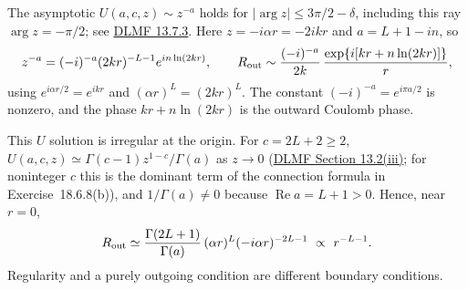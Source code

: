 The asymptotic $U(a,c,z)\sim z^{-a}$ holds for
$|\arg z|\le3\pi/2-\delta$, including this ray $\arg z=-\pi/2$; see
\href{https://dlmf.nist.gov/13.7.E3}{DLMF 13.7.3}.  Here
$z=-i\alpha r=-2ikr$ and $a=L+1-in$, so
\[
z^{-a}=(-i)^{-a}(2kr)^{-L-1}e^{in\ln(2kr)},\qquad
R_{\rm out}\sim\frac{(-i)^{-a}}{2k}\,
 \frac{\exp\{i[kr+n\ln(2kr)]\}}r,
\]
using $e^{i\alpha r/2}=e^{ikr}$ and $(\alpha r)^L=(2kr)^L$.
The constant $(-i)^{-a}=e^{i\pi a/2}$ is nonzero, and the phase
$kr+n\ln(2kr)$ is the outward Coulomb phase.

This $U$ solution is irregular at the origin.  For $c=2L+2\ge2$,
$U(a,c,z)\simeq\Gamma(c-1)z^{1-c}/\Gamma(a)$ as $z\to0$
(\href{https://dlmf.nist.gov/13.2}{DLMF Section 13.2(iii)}; for
noninteger $c$ this is the dominant term of the connection formula
in Exercise~18.6.8(b)), and $1/\Gamma(a)\ne0$ because
$\operatorname{Re}a=L+1>0$.  Hence, near $r=0$,
\[
R_{\rm out}\simeq\frac{\Gamma(2L+1)}{\Gamma(a)}\,
 (\alpha r)^L(-i\alpha r)^{-2L-1}\ \propto\ r^{-L-1}.
\]
Regularity and a purely outgoing condition are different
boundary conditions.

